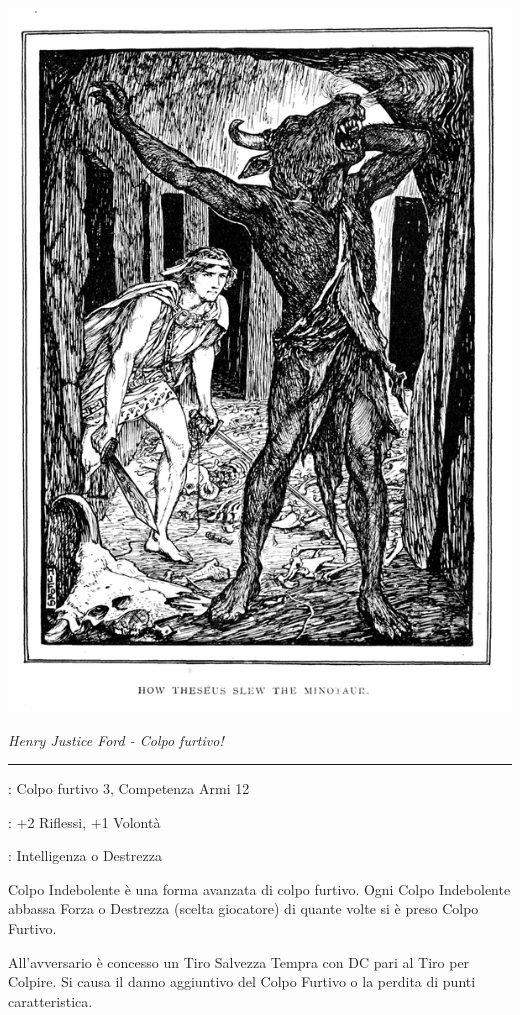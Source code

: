 \begin{multicols}{2}
\begin{center}
	\includegraphics[width=0.7\linewidth]{immagini/teseo.png}

	\emph{Henry Justice Ford - Colpo furtivo!}
\end{center}

\smallskip\noindent\rule{\linewidth}{2pt} \hypertarget{Colpo Indebolente}{}\medskip{}
\noindent
\begin{description}[noitemsep, topsep=0pt, parsep=0pt, partopsep=0pt, leftmargin=0cm, labelwidth=2.5cm]
    \item[\textbf{Requisito}]: Colpo furtivo 3, Competenza Armi 12
    \item[\textbf{Tiri Salvezza}]: +2 Riflessi, +1 Volontà
    \item[\textbf{Caratteristica}]: Intelligenza o Destrezza
\end{description}

Colpo Indebolente è una forma avanzata di colpo furtivo. Ogni Colpo Indebolente abbassa Forza o Destrezza (scelta giocatore) di quante volte si è preso Colpo Furtivo.

All'avversario è concesso un Tiro Salvezza Tempra con DC pari al Tiro per Colpire. Si causa il danno aggiuntivo del Colpo Furtivo o la perdita di punti caratteristica.


\end{multicols}
